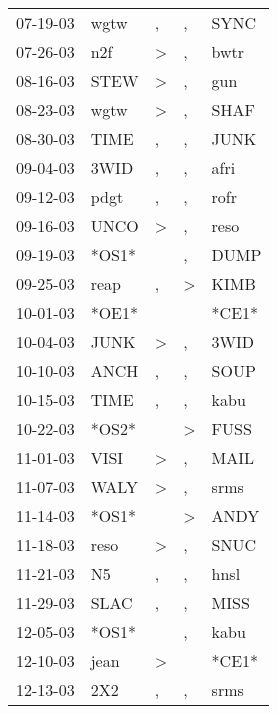 \begin{supertabular}{lllll}
 07-19-03 &   wgtw &                , &                , &   SYNC \\
 07-26-03 &    n2f &     \textgreater &                , &   bwtr \\
 08-16-03 &   STEW &     \textgreater &                , &    gun \\
 08-23-03 &   wgtw &     \textgreater &                , &   SHAF \\
 08-30-03 &   TIME &                , &                , &   JUNK \\
 09-04-03 &   3WID &                , &                , &   afri \\
 09-12-03 &   pdgt &                , &                , &   rofr \\
 09-16-03 &   UNCO &     \textgreater &                , &   reso \\
 09-19-03 &  *OS1* &                  &                , &   DUMP \\
 09-25-03 &   reap &                , &     \textgreater &   KIMB \\
 10-01-03 &  *OE1* &                  &                  &  *CE1* \\
 10-04-03 &   JUNK &     \textgreater &                , &   3WID \\
 10-10-03 &   ANCH &                , &                , &   SOUP \\
 10-15-03 &   TIME &                , &                , &   kabu \\
 10-22-03 &  *OS2* &                  &     \textgreater &   FUSS \\
 11-01-03 &   VISI &     \textgreater &                , &   MAIL \\
 11-07-03 &   WALY &     \textgreater &                , &   srms \\
 11-14-03 &  *OS1* &                  &     \textgreater &   ANDY \\
 11-18-03 &   reso &     \textgreater &                , &   SNUC \\
 11-21-03 &     N5 &                , &                , &   hnsl \\
 11-29-03 &   SLAC &                , &                , &   MISS \\
 12-05-03 &  *OS1* &                  &                , &   kabu \\
 12-10-03 &   jean &     \textgreater &                  &  *CE1* \\
 12-13-03 &    2X2 &                , &                , &   srms \\

\end{supertabular}
